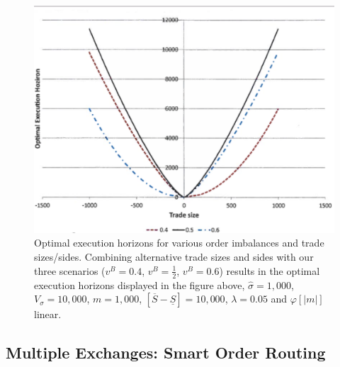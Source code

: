         \begin{figure}[!ht] 
        \centering
        \includegraphics[width=\textwidth]{chapters/chapter_exec_models/figures/fig3temp.png}
         \caption{Optimal execution horizons for various order imbalances and trade sizes/sides. Combining alternative trade sizes and sides with our three scenarios ($v^B=0.4$, $v^B=\frac{1}{2}$, $v^B=0.6$) results in the optimal execution horizons displayed in the figure above, $\hat{\sigma}=1,000$, $V_\sigma=10,000$, $m=1,000$, $[\overline{S}-\underline{S}]=10,000$, $\lambda=0.05$ and $\varphi[|m|]$ linear. \label{fig:3temp}}
        \end{figure} 



\subsection{Multiple Exchanges:  Smart Order Routing}


